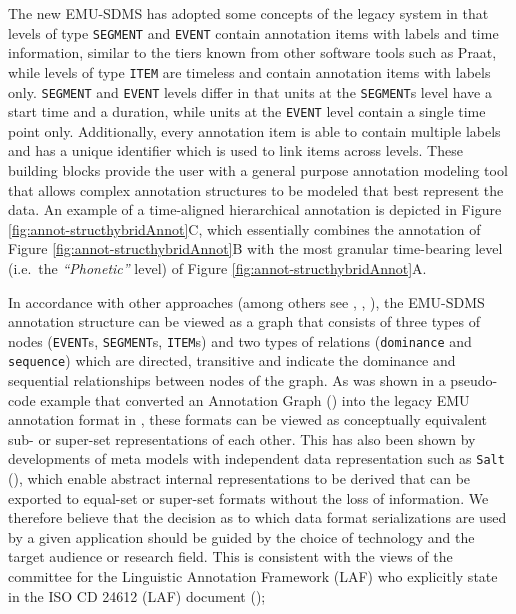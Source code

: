 \documentclass[]{book}
\begin{document}
The new EMU-SDMS has adopted some concepts of the legacy system in that levels of type \texttt{SEGMENT} and \texttt{EVENT} contain annotation items with labels and time information, similar to the tiers known from other software tools such as Praat, while levels of type \texttt{ITEM} are timeless and contain annotation items with labels only. \texttt{SEGMENT} and \texttt{EVENT} levels differ in that units at the \texttt{SEGMENT}s level have a start time and a duration, while units at the \texttt{EVENT} level contain a single time point only. Additionally, every annotation item is able to contain multiple labels and has a unique identifier which is used to link items across levels. These building blocks provide the user with a general purpose annotation modeling tool that allows complex annotation structures to be modeled that best represent the data. An example of a time-aligned hierarchical annotation is depicted in Figure \ref{fig:annot-structhybridAnnot}C, which essentially combines the annotation of Figure \ref{fig:annot-structhybridAnnot}B with the most granular time-bearing level (i.e.~the \emph{``Phonetic''} level) of Figure \ref{fig:annot-structhybridAnnot}A.

In accordance with other approaches (among others see \citet{bird:sc2001a}, \citet{zipser:2010a}, \citet{ide:nle2004a}), the EMU-SDMS annotation structure can be viewed as a graph that consists of three types of nodes (\texttt{EVENT}s, \texttt{SEGMENT}s, \texttt{ITEM}s) and two types of relations (\texttt{dominance} and \texttt{sequence}) which are directed, transitive and indicate the dominance and sequential relationships between nodes of the graph. As was shown in a pseudo-code example that converted an Annotation Graph (\citet{bird:sc2001a}) into the legacy EMU annotation format in \citet{cassidy:sc2001a}, these formats can be viewed as conceptually equivalent sub- or super-set representations of each other. This has also been shown by developments of meta models with independent data representation such as \texttt{Salt} (\citet{zipser:2010a}), which enable abstract internal representations to be derived that can be exported to equal-set or super-set formats without the loss of information. We therefore believe that the decision as to which data format serializations are used by a given application should be guided by the choice of technology and the target audience or research field. This is consistent with the views of the committee for the Linguistic Annotation Framework (LAF) who explicitly state in the ISO CD 24612 (LAF) document (\citet{ISOLAF});
\end{document}
